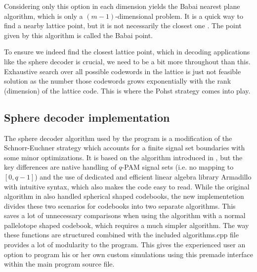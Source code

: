 \documentclass[english,12pt,a4paper,pdftex,sci,utf8]{aaltothesis}
\begin{document}
Considering only this option in each dimension yields the Babai nearest plane algorithm, which is only a $(m-1)$-dimensional problem. It is a quick way to find a nearby lattice point, but it is not necessarily the closest one \cite{agrell}. The point given by this algorithm is called the Babai point.
\par To ensure we indeed find the closest lattice point, which in decoding applications like the sphere decoder is crucial, we need to be a bit more throughout than this. Exhaustive search over all possible codewords in the lattice is just not feasible solution as the number those codewords grows exponentially with the rank (dimension) of the lattice code. This is where the Pohst strategy comes into play.

\subsection{Sphere decoder implementation}
The sphere decoder algorithm used by the program is a modification of the Schnorr-Euchner strategy which accounts for a finite signal set boundaries with some minor optimizations. It is based on the algorithm introduced in \cite{mia}, but the key differences are native handling of $q$-PAM signal sets (i.e. no mapping to $[0,q-1]$) and the use of dedicated and efficient linear algebra library Armadillo \cite{arma} with intuitive syntax, which also makes the code easy to read. While the original algorithm in \cite{mia} also handled spherical shaped codebooks, the new implementetion divides these two scenarios for codebooks into two separate algorithms. This saves a lot of unnecessary comparisons when using the algorithm with a normal pallelotope shaped codebook, which requires a much simpler algorithm. The way these functions are structured combined with the included algorithms.cpp file provides a lot of modularity to the program. This gives the experienced user an option to program his or her own custom simulations using this premade interface within the main program source file.
\end{document}
